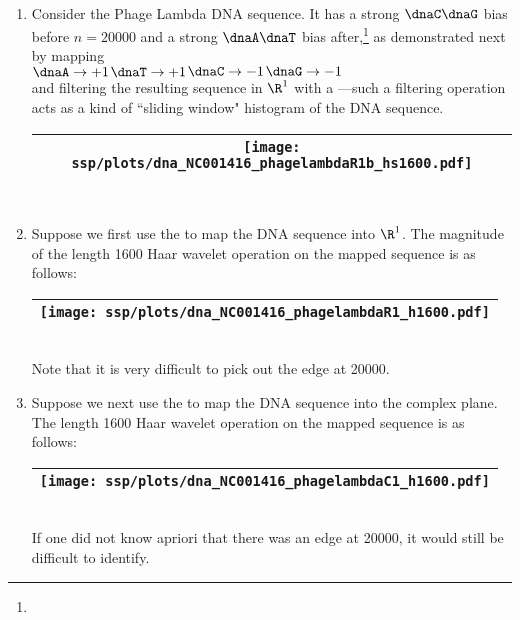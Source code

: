 \begin{example}
\label{ex:dnapl}
\mbox{}\\
\begin{enumerate}
  \item \label{item:dnapl_psp}
     Consider the Phage Lambda DNA sequence.
     It has a strong $\dnaC\dnaG$ bias before $n=20000$ and 
            a strong $\dnaA\dnaT$ bias after,\footnote{}
     as demonstrated next by mapping 
     \\\indentx$\dnaA\to+1$\qquad$\dnaT\to+1$\qquad$\dnaC\to-1$\qquad$\dnaG\to-1$\\
     and filtering the resulting sequence in $\R^1$
     with a  ---such
     a filtering operation acts as a kind of ``sliding window" histogram of the DNA sequence.
     \\\begin{tabular}{|>{\scs}c|}
          \hline
          \texttt{[image: ssp/plots/dna\_NC001416\_phagelambdaR1b\_hs1600.pdf]}%
        \\\hline
     \end{tabular}\\
  
  \item \label{item:dnapl_R1pam}
    Suppose we first use the   to map
    the DNA sequence into $\R^1$.
    The magnitude of the length 1600 Haar wavelet operation on the mapped sequence is as follows:
     \\\begin{tabular}{|>{\scs}c|}
          \hline
          \texttt{[image: ssp/plots/dna\_NC001416\_phagelambdaR1\_h1600.pdf]}%
        \\\hline
     \end{tabular}\\
    Note that it is very difficult to pick out the edge at 20000.

  \item \label{item:dnapl_C1qpsk}
    Suppose we next use the   to map
    the DNA sequence into the complex plane.
    The length 1600 Haar wavelet operation on the mapped sequence is as follows:
     \\\begin{tabular}{|>{\scs}c|}
          \hline
          \texttt{[image: ssp/plots/dna\_NC001416\_phagelambdaC1\_h1600.pdf]}%
        \\\hline
     \end{tabular}\\
     If one did not know apriori that there was an edge at 20000, it would still be difficult to identify.
     

\end{enumerate}
\end{example}
